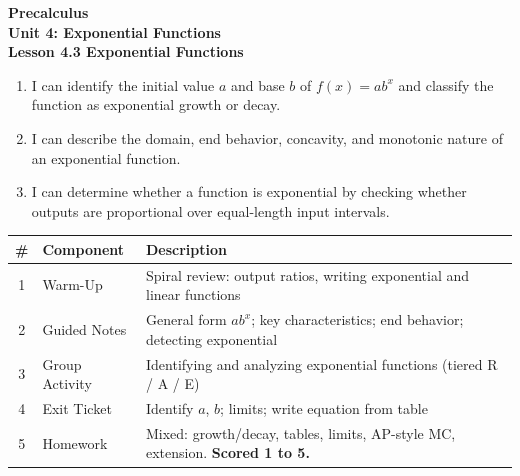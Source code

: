 \documentclass[10pt]{article}
\begin{document}
\vspace{-0.8in}

\begin{center}
  {\color{white}\textbf{\LARGE Precalculus}}\\[4pt]
  {\color{skymid}\large\textbf{Unit 4: Exponential Functions}}\\[6pt]
  {\color{white}\textbf{\large Lesson 4.3 \quad Exponential Functions}}
\end{center}

\vspace{0.22in}
\namedateperiod
\vspace{0.18in}

\begin{learningtargetbox}
\small
\begin{enumerate}[leftmargin=1.5em, itemsep=5pt]
  \item I can identify the initial value $a$ and base $b$ of $f(x) = ab^x$ and classify the
        function as exponential growth or decay.
  \item I can describe the domain, end behavior, concavity, and monotonic nature of an
        exponential function.
  \item I can determine whether a function is exponential by checking whether outputs are
        proportional over equal-length input intervals.
\end{enumerate}
\end{learningtargetbox}

\vspace{0.14in}

\begin{tocbox}
\small
\renewcommand{\arraystretch}{1.5}
\begin{tabularx}{\linewidth}{@{} c l X @{}}
\rowcolor{sky}
\textbf{\#} & \textbf{Component} & \textbf{Description} \\
\midrule
1 & Warm-Up        & Spiral review: output ratios, writing exponential and linear functions \\
2 & Guided Notes   & General form $ab^x$; key characteristics; end behavior; detecting exponential \\
3 & Group Activity & Identifying and analyzing exponential functions (tiered R / A / E) \\
4 & Exit Ticket    & Identify $a$, $b$; limits; write equation from table \\
5 & Homework       & Mixed: growth/decay, tables, limits, AP-style MC, extension. \textbf{Scored 1 to 5.} \\
\end{tabularx}
\end{tocbox}
\end{document}
